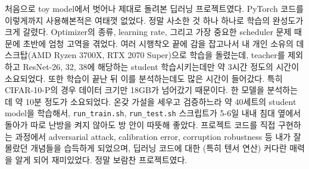 \documentclass[a4paper, 10pt]{article}
\begin{document}
처음으로 toy model에서 벗어나 제대로 돌려본 딥러닝 프로젝트였다. PyTorch 코드를
이렇게까지 사용해본적은 여태껏 없었다. 정말 사소한 것 하나 하나로 학습의
완성도가 크게 갈렸다. Optimizer의 종류, learning rate, 그리고 가장 중요한
scheduler 문제 때문에 초반에 엄청 고역을 겪었다. 여러 시행착오 끝에 감을
잡고나서 내 개인 소유의 데스크탑(AMD Ryzen 3700X, RTX 2070 Super)으로 학습을
돌렸는데, teacher를 제외하고 ResNet-26, 32, 38에 해당하는 student 학습시키는데만
약 3시간 정도의 시간이 소요되었다. 또한 학습이 끝난 뒤 이를 분석하는데도 많은
시간이 들어갔다. 특히 CIFAR-10-P의 경우 데이터 크기만 18GB가 넘어갔기 때문이다.
한 모델을 분석하는데 약 10분 정도가 소요되었다. 온갖 가설을 세우고 검증하느라 약
40세트의 student model을 학습해서, \texttt{run\_train.sh}, \texttt{run\_test.sh}
스크립트가 5-6일 내내 침대 옆에서 돌아가 따로 난방을 켜지 않아도 방 안이 따뜻해
좋았다. 프로젝트 코드를 직접 구현하는 과정에서 adversarial attack, calibration
error, corruption robustness 등 내가 잘 몰랐던 개념들을 습득하게 되었으며,
딥러닝 코드에 대한 (특히 텐서 연산) 커다란 매력을 알게 되어 재미있었다. 정말
보람찬 프로젝트였다.






\end{document}

